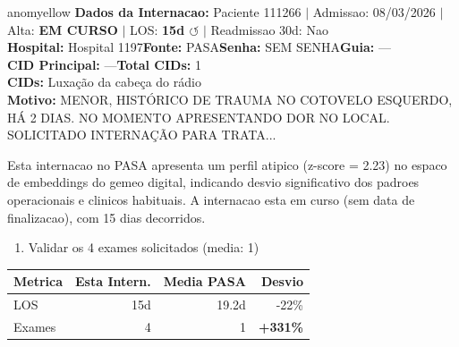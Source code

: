 \documentclass[a4paper,10pt]{article}
\begin{document}
\begin{anomalycard}[Internacao 185666 | PASA | MODERADO (z=2.23)]{anomyellow}
\textbf{Dados da Internacao:} Paciente 111266 $\mid$ Admissao: 08/03/2026 $\mid$ Alta: \textcolor{anomorange}{\textbf{EM CURSO}} $\mid$ LOS: \textbf{15d \textcolor{anomorange}{$\circlearrowleft$}} $\mid$ Readmissao 30d: Nao\\
\textbf{Hospital:} Hospital 1197\quad\textbf{Fonte:} PASA\quad\textbf{Senha:} SEM SENHA\quad\textbf{Guia:} ---\\
\textbf{CID Principal:} {\small ---}\quad\textbf{Total CIDs:} 1\\

\textbf{CIDs:} {\scriptsize Luxação da cabeça do rádio}\\

\textbf{Motivo:} {\scriptsize MENOR, HISTÓRICO DE TRAUMA NO COTOVELO ESQUERDO, HÁ 2 DIAS. NO MOMENTO APRESENTANDO DOR NO LOCAL. SOLICITADO INTERNAÇÃO PARA TRATA...}\\

\vspace{2pt}\begin{tcolorbox}[colback=severityred!20,colframe=anomyellow,title={\textbf{Interpretacao de Negocio}},fonttitle=\bfseries\small,left=4pt,right=4pt,top=3pt,bottom=3pt]
{\small Esta internacao no PASA apresenta um perfil atipico (z-score = 2.23) no espaco de embeddings do gemeo digital, indicando desvio significativo dos padroes operacionais e clinicos habituais. A internacao esta em curso (sem data de finalizacao), com 15 dias decorridos.}
\end{tcolorbox}
\begin{tcolorbox}[colback=severityyellow!30,colframe=anomorange,title={\textbf{Recomendacoes Especificas}},fonttitle=\bfseries\small,left=4pt,right=4pt,top=3pt,bottom=3pt]
\begin{enumerate}[nosep,leftmargin=16pt]
\item {\small Validar os 4 exames solicitados (media: 1)}
\end{enumerate}
\end{tcolorbox}
\begin{center}\begin{tabular}{l r r r}\toprule\textbf{Metrica} & \textbf{Esta Intern.} & \textbf{Media PASA} & \textbf{Desvio} \\\midrule
LOS & 15d & 19.2d & -22\% \\
Exames & 4 & 1 & \textcolor{anomred}{\textbf{+331\%}} \\
\bottomrule\end{tabular}\end{center}


\end{anomalycard}
\end{document}
